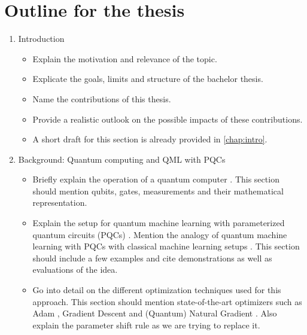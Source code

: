 \chapter{Outline for the thesis}
\label{chap:outline}

\begin{enumerate}
    \item Introduction
    \begin{itemize}
        \item
            Explain the motivation and relevance of the topic.
        \item
            Explicate the goals, limits and structure of the bachelor thesis.
        \item
            Name the contributions of this thesis.
        \item
            Provide a realistic outlook on the possible impacts of these
            contributions.
        \item
            A short draft for this section is already provided in
            \autoref{chap:intro}.
    \end{itemize}

    \item Background: Quantum computing and QML with PQCs
    \begin{itemize}
        \item
            Briefly explain the operation of a quantum computer
            \cite{nielsen_quantum_2007}.
            This section should mention qubits, gates, measurements and their
            mathematical representation.
        \item
            Explain the setup for quantum machine learning with parameterized
            quantum circuits (PQCs) \cite{mitarai_quantum_2018}.
            Mention the analogy of quantum machine learning with PQCs with
            classical machine learning setups \cite{bishop_pattern_2006}.
            This section should include a few examples and cite demonstrations
            as well as evaluations of the idea.
        \item
            Go into detail on the different optimization techniques used for
            this approach.
            This section should mention state-of-the-art optimizers such as
            Adam \cite{kingma_adam_2017}, Gradient Descent and
            (Quantum) Natural Gradient \cite{stokes_quantum_2020}.
            Also explain the parameter shift rule
            \cite{mitarai_quantum_2018,schuld_evaluating_2019} as we are trying
            to replace it.
    \end{itemize}


\end{enumerate}
